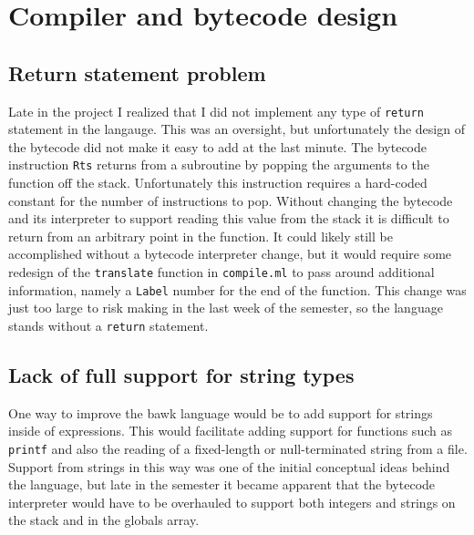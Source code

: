 \section{Compiler and bytecode design}

\subsection{Return statement problem}
\label{sec:lessons-return}
Late in the project I realized that I did not implement any type of \texttt{return} statement in the langauge.  This was an oversight, but unfortunately the design of the bytecode did not make it easy to add at the last minute. The bytecode instruction \texttt{Rts} returns from a subroutine by popping the arguments to the function off the stack.  Unfortunately this instruction requires a hard-coded constant for the number of instructions to pop.  Without changing the bytecode and its interpreter to support reading this value from the stack it is difficult to return from an arbitrary point in the function.  It could likely still be accomplished without a bytecode interpreter change, but it would require some redesign of the \texttt{translate} function in \texttt{compile.ml} to pass around additional information, namely a \texttt{Label} number for the end of the function.  This change was just too large to risk making in the last week of the semester, so the language stands without a \texttt{return} statement.

\subsection{Lack of full support for string types}
One way to improve the bawk language would be to add support for strings inside of expressions.  This would facilitate adding support for functions such as \texttt{printf} and also the reading of a fixed-length or null-terminated string from a file.  Support from strings in this way was one of the initial conceptual ideas behind the language, but late in the semester it became apparent that the bytecode interpreter would have to be overhauled to support both integers and strings on the stack and in the globals array.